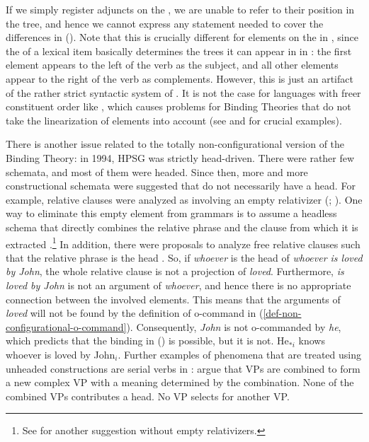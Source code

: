 \documentclass[output=paper,biblatex,babelshorthands,newtxmath,draftmode,colorlinks,citecolor=brown]{langscibook}
\begin{document}
\zl
If we simply register adjuncts on the \depsl, we are unable to refer to their
position in the tree, and hence we cannot express any statement needed to cover the differences in
(). Note that this is crucially different for elements on the \argstl in , since the \argst of a lexical item
basically determines the trees it can appear in in : the first element appears to the left of
the verb as the subject, and all other elements appear to the right of the verb as complements. However,
this is just an artifact of the rather strict syntactic system of . It is not the case for
languages with freer constituent order like , which causes problems for Binding Theories that do not
take the linearization of elements into account (see \citealp[]{Grewendorf85a} and
\citealp[]{Riezler95a} for crucial examples).

There is another issue related to the totally non-configurational version of the Binding Theory: in 1994, HPSG was strictly
head-driven. There were rather few schemata, and most of them were headed. Since then, more and more
constructional schemata were suggested that do not necessarily have a head. For example, relative
clauses were analyzed as involving an empty relativizer (\citealp[Chapter~5]{ps2}; ). One way to eliminate this empty element from
grammars is to assume a headless schema that directly combines the relative phrase and the clause from which
it is extracted \parencites[Section~2.7]{Mueller99b}[522]{Sag:10b}[]{MuellerCurrentApproaches}.\footnote{%
See \citet{Sag97a} for another suggestion without empty relativizers.
} In addition, there were proposals to analyze free
relative clauses such that the relative phrase is the head
\citep[]{WK2003a}. So, if \emph{whoever} is the head of \emph{whoever is loved by John}, the whole
relative clause is not a projection of \emph{loved}. Furthermore, \emph{is loved by John} is not an argument
of \emph{whoever}, and hence there is no appropriate connection between the involved elements. 
This means that the arguments of \emph{loved} will not be found by the definition of o-command in
(\ref{def-non-configurational-o-command}). Consequently, \emph{John} is not o-commanded by
\emph{he}, which predicts that the binding in () is possible, but it is not. 
\ea
He$_{*i}$ knows whoever is loved by John$_i$.
\z
Further examples of phenomena that are treated using unheaded constructions are serial verbs in
: \citet{ML2009a} argue that VPs are combined to form a new complex VP with a
meaning determined by the combination. None of the combined VPs contributes a head. No VP selects
for another VP. 
\end{document}
